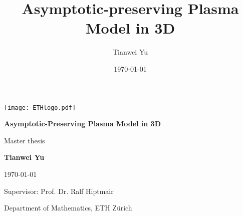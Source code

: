 \documentclass{report}
\title{\textbf{Asymptotic-preserving Plasma Model in 3D}}
\author{Tianwei Yu}
\date{\today}
\begin{document}
\begin{titlepage}
\noindent \texttt{[image: ETHlogo.pdf]}

\centering
\vspace*{7cm}

\textbf{\LARGE Asymptotic-Preserving Plasma Model in 3D}

\vspace{3cm}
\large

Master thesis

\vspace{0.25cm}

\textbf{Tianwei Yu}

\vspace{0.25cm}

\today

\vspace{7cm}

Supervisor: Prof. Dr. Ralf Hiptmair

\vspace{0.25cm}

Department of Mathematics, ETH Z\"{u}rich




\end{titlepage}
\end{document}
